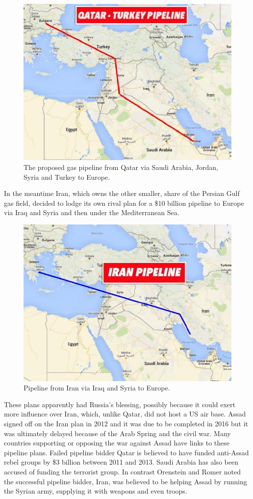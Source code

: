 \begin{figure}[!h]
	\begin{center}
		\includegraphics[width=0.5\linewidth]{images/pipe_line_turkey}
		\caption{The proposed gas pipeline from Qatar via Saudi Arabia, Jordan, Syria and Turkey to Europe.}
	\end{center}
\end{figure}

\newpage
In the meantime Iran, which owns the other smaller, share of the Persian Gulf gas field, decided to lodge its own rival plan for a \$10 billion pipeline to Europe via Iraq and Syria and then under the Mediterranean Sea.

\begin{figure}[!h]
	\begin{center}
		\includegraphics[width=0.5\linewidth]{images/pipe_line_iran}
		\caption{Pipeline from Iran via Iraq and Syria to Europe.}
	\end{center}
\end{figure}

These plans apparently had Russia’s blessing, possibly because it could exert more influence over Iran, which, unlike Qatar, did not host a US air base.
Assad signed off on the Iran plan in 2012 and it was due to be completed in 2016 but it was ultimately delayed because of the Arab Spring and the civil war.
Many countries supporting or opposing the war against Assad have links to these pipeline plans.
Failed pipeline bidder Qatar is believed to have funded anti-Assad rebel groups by \$3 billion between 2011 and 2013. Saudi Arabia has also been accused of funding the terrorist group.
In contrast Orenstein and Romer noted the successful pipeline bidder, Iran, was believed to be helping Assad by running the Syrian army, supplying it with weapons and even troops.

